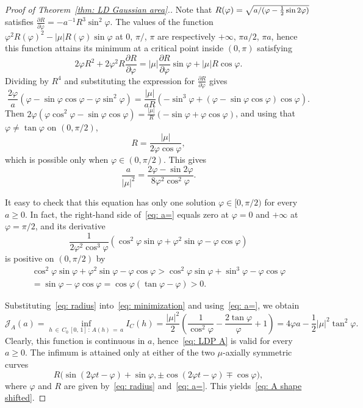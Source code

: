\documentclass[AHL,Unicode,published]{cedram}
\newcommand{\Jcl}{\mathcal{J}}
\begin{document}
\begin{proof}[Proof of Theorem~\ref{thm: LD Gaussian area}.]
Note that $R(\varphi)=\sqrt{\text{\small{$a/(\varphi - \frac12 \sin 2 \varphi)$}}}$ satisfies $\frac{\partial R}{\partial \varphi} = -a^{-1} R^3 \sin^2 \varphi$. The values of the function $\varphi^2 R(\varphi)^2 - |\mu| R(\varphi) \sin \varphi$ at $0$, $\pi/$, $\pi$ are respectively $+\infty$, $\pi a/2$, $\pi a$, hence this function attains its minimum at a critical point inside $(0, \pi)$ satisfying
\[
2 \varphi R^2 + 2 \varphi^2 R \frac{\partial R}{\partial \varphi} = |\mu| \frac{\partial R}{\partial \varphi} \sin \varphi + |\mu| R \cos \varphi.
\]
Dividing by $R^4$ and substituting the expression for $\frac{\partial R}{\partial \varphi}$ gives
\[
\frac{2 \varphi}{a}\left(\varphi - \sin \varphi \cos \varphi - \varphi \sin^2 \varphi\right) = \frac{|\mu|}{a R} \left(- \sin^3 \varphi + \left(\varphi - \sin \varphi \cos \varphi\right)\cos \varphi\right).
\]
Then $2 \varphi(\varphi \cos^2 \varphi - \sin \varphi \cos \varphi) = \frac{|\mu|}{R} (- \sin \varphi + \varphi \cos \varphi)$, and using that $\varphi \neq \tan \varphi $ on $(0, \pi/2)$,
\begin{equation}\label{eq: radius}
R = \frac{|\mu|}{2 \varphi \cos \varphi},
\end{equation}
which is possible only when $\varphi \in (0, \pi/2)$. This gives
\begin{equation}\label{eq: a=}
\frac{a}{|\mu|^2} = \frac{2\varphi - \sin 2 \varphi}{8 \varphi^2 \cos^2 \varphi}.
\end{equation}

It easy to check that this equation has only one solution $\varphi \in [0, \pi/2)$ for every $a\ge 0$. In fact, the right-hand side of~\eqref{eq: a=} equals zero at $\varphi =0$ and $+\infty$ at $\varphi = \pi/2$, and its derivative
\[
\frac{1}{2\varphi^2 \cos^3\varphi} \left(
\cos^2 \varphi \sin \varphi + \varphi^2\sin \varphi - \varphi \cos \varphi
\right)
\]
is positive on $ (0, \pi/2)$ by
\begin{multline*}
\cos^2 \varphi \sin \varphi + \varphi^2\sin \varphi - \varphi \cos \varphi>
\cos^2 \varphi \sin \varphi + \sin^3 \varphi - \varphi \cos \varphi\\
=\sin \varphi -\varphi \cos \varphi=
\cos \varphi (\tan \varphi - \varphi)>0.
\end{multline*}

Substituting~\eqref{eq: radius} into~\eqref{eq: minimization} and using~\eqref{eq: a=}, we obtain
\[
\Jcl_A(a) = \inf_{h\,\in\,C_0\,[0,\,1]\,:\,A(h)\,=\,a} I_C(h) = \frac{|\mu|^2}{2} \left(\frac{1}{\cos^2 \varphi} - \frac{2 \tan \varphi}{\varphi} + 1 \right) = 4 \varphi a -\frac12 |\mu|^2 \tan^2 \varphi.
\]
Clearly, this function is continuous in $a$, hence~\eqref{eq: LDP A} is valid for every $a \ge 0$. The infimum is attained only at either of the two $\mu$-axially symmetric curves
\[
R \big(\sin(2 \varphi t - \varphi) + \sin \varphi,\pm \cos(2 \varphi t - \varphi) \mp \cos \varphi \big),
\]
where $\varphi$ and $R$ are given by~\eqref{eq: radius} and~\eqref{eq: a=}. This yields~\eqref{eq: A shape shifted}.
\end{proof}
\end{document}

